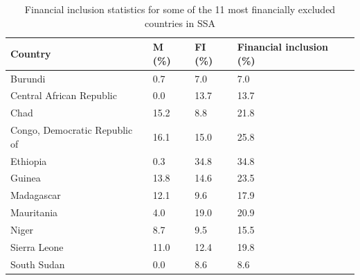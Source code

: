 \documentclass[11pt, a4paper]{article}
\begin{document}
\begin{table}[ht]
\begin{tabular}{|l|l|l|l|}
\hline
\textbf{Country}              & \textbf{M (\%)} & \textbf{FI (\%)} & \textbf{Financial inclusion (\%)} \\ \hline
Burundi                       & 0.7                        & 7.0                                            & 7.0                                  \\ \hline
Central African Republic      & 0.0                        & 13.7                                           & 13.7                                  \\ \hline
Chad                          & 15.2                       & 8.8                                            & 21.8                                 \\ \hline
Congo, Democratic Republic of & 16.1                       & 15.0                                           & 25.8                                  \\ \hline
Ethiopia                      & 0.3                        & 34.8                                           & 34.8                                  \\ \hline
Guinea                        & 13.8                       & 14.6                                           & 23.5                                  \\ \hline
Madagascar                    & 12.1                       & 9.6                                            & 17.9                                  \\ \hline
Mauritania                    & 4.0                        & 19.0                                           & 20.9                                  \\ \hline
Niger                         & 8.7                        & 9.5                                            & 15.5                                  \\ \hline
Sierra Leone                  & 11.0                       & 12.4                                           & 19.8                                  \\ \hline
South Sudan                   & 0.0                        & 8.6                                            & 8.6                                  \\ \hline
\end{tabular}
\caption{Financial inclusion statistics for some of the 11 most financially excluded countries in SSA}
\label{tab:financial_statistics_ssa}
\end{table}
\end{document}

